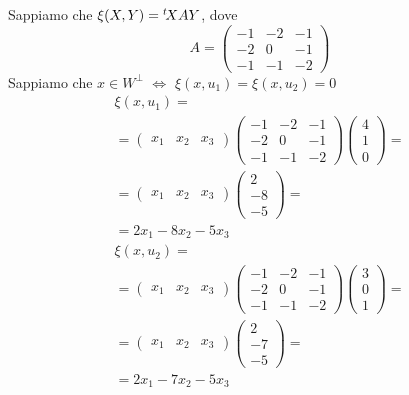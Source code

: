 {    Sappiamo che $ \xi(X,Y)=\null^{t}\!X A Y $, dove \[
        A=\begin{pmatrix}
            -1 & -2 & -1\\
            -2 & 0 & -1\\
            -1 & -1 & -2
        \end{pmatrix}
    \]
    Sappiamo che $ x \in W^{\bot} $ $ \iff $ $ \xi(x, u_1)=\xi(x, u_2)=0 $ \begin{multline*}
        \xi (x, u_1)=\\= \begin{pmatrix}
            x_1 & x_2 & x_3
        \end{pmatrix}\begin{pmatrix}
            -1 & -2 & -1\\
            -2 & 0 & -1\\
            -1 & -1 & -2
        \end{pmatrix}\begin{pmatrix}
            4\\1\\0
        \end{pmatrix}=\\
        =\begin{pmatrix}
            x_1 & x_2 & x_3
        \end{pmatrix}\begin{pmatrix}
            2\\-8\\-5
        \end{pmatrix}=\\=
        2x_1-8x_2-5x_3
    \end{multline*}
    \begin{multline*}
        \xi (x, u_2)=\\= \begin{pmatrix}
            x_1 & x_2 & x_3
        \end{pmatrix}\begin{pmatrix}
            -1 & -2 & -1\\
            -2 & 0 & -1\\
            -1 & -1 & -2
        \end{pmatrix}\begin{pmatrix}
            3\\0\\1
        \end{pmatrix}=\\
        =\begin{pmatrix}
            x_1 & x_2 & x_3
        \end{pmatrix}\begin{pmatrix}
            2\\-7\\-5
        \end{pmatrix}=\\
        =2x_1-7x_2-5x_3
    \end{multline*} 
    
}
